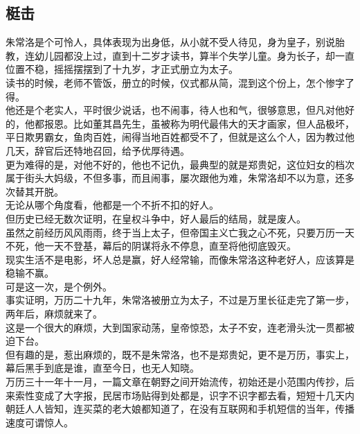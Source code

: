 \begin{multicols}{\theparacolNo}
\subsection{梃击}
朱常洛是个可怜人，具体表现为出身低，从小就不受人待见，身为皇子，别说胎教，连幼儿园都没上过，直到十二岁才读书，算半个失学儿童。身为长子，却一直位置不稳，摇摇摆摆到了十九岁，才正式册立为太子。\\

读书的时候，老师不管饭，册立的时候，仪式都从简，混到这个份上，怎个惨字了得。\\

他还是个老实人，平时很少说话，也不闹事，待人也和气，很够意思，但凡对他好的，他都报恩。比如董其昌先生，虽被称为明代最伟大的天才画家，但人品极坏，平日欺男霸女，鱼肉百姓，闹得当地百姓都受不了，但就是这么个人，因为教过他几天，辞官后还特地召回，给予优厚待遇。\\

更为难得的是，对他不好的，他也不记仇，最典型的就是郑贵妃，这位妇女的档次属于街头大妈级，不但多事，而且闹事，屡次跟他为难，朱常洛却不以为意，还多次替其开脱。\\

无论从哪个角度看，他都是一个不折不扣的好人。\\

但历史已经无数次证明，在皇权斗争中，好人最后的结局，就是废人。\\

虽然之前经历风风雨雨，终于当上太子，但帝国主义亡我之心不死，只要万历一天不死，他一天不登基，幕后的阴谋将永不停息，直至将他彻底毁灭。\\

现实生活不是电影，坏人总是赢，好人经常输，而像朱常洛这种老好人，应该算是稳输不赢。\\

可是这一次，是个例外。\\

事实证明，万历二十九年，朱常洛被册立为太子，不过是万里长征走完了第一步，两年后，麻烦就来了。\\

这是一个很大的麻烦，大到国家动荡，皇帝惊恐，太子不安，连老滑头沈一贯都被迫下台。\\

但有趣的是，惹出麻烦的，既不是朱常洛，也不是郑贵妃，更不是万历，事实上，幕后黑手到底是谁，直至今日，也无人知晓。\\

万历三十一年十一月，一篇文章在朝野之间开始流传，初始还是小范围内传抄，后来索性变成了大字报，民居市场贴得到处都是，识字不识字都去看，短短十几天内朝廷人人皆知，连买菜的老大娘都知道了，在没有互联网和手机短信的当年，传播速度可谓惊人。\\


\end{multicols}

